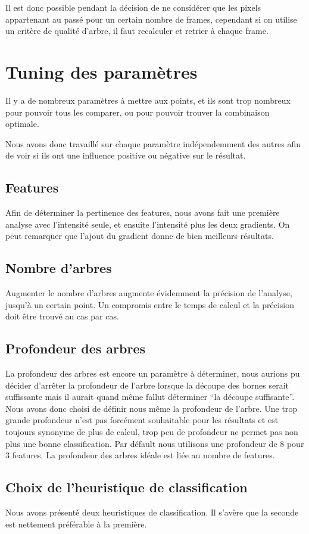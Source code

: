 \documentclass[11pt,a4paper]{report}
\begin{document}
			Il est donc possible pendant la décision de ne considérer que les pixels appartenant au passé pour un certain nombre de 
			frames, cependant si on utilise un critère de qualité d'arbre, il faut recalculer et retrier à chaque frame.

\section{Tuning des paramètres}

	Il y a de nombreux paramètres à mettre aux points, et ils sont trop nombreux pour pouvoir tous les comparer, ou pour pouvoir trouver la combinaison optimale.
	
	Nous avons donc travaillé sur chaque paramètre indépendemment des autres afin de voir si ils ont une influence positive ou négative sur le résultat. 
	\subsection{Features}
		Afin de déterminer la pertinence des features, nous avons fait une première analyse avec l'intensité seule, et ensuite l'intensité 
		plus les deux gradients.
		On peut remarquer que l'ajout du gradient donne de bien meilleurs résultats.
	\subsection{Nombre d'arbres}
	Augmenter le nombre d'arbres augmente évidemment la précision de l'analyse, jusqu'à un certain point. Un compromis entre le temps de calcul et la
	précision doit être trouvé au cas par cas. 

	\subsection{Profondeur des arbres}
	La profondeur des arbres est encore un paramètre à déterminer, nous aurions pu décider d'arrêter la profondeur de l'arbre lorsque la découpe 
	des bornes serait suffissante mais il aurait quand même fallut déterminer ``la découpe suffisante''. Nous avons donc choisi de 
	définir nous même la profondeur de l'arbre. Une trop grande profondeur n'est pas forcément souhaitable pour les résultats et 
	est toujours synonyme de plus de calcul, trop peu de profondeur ne permet pas non plus une bonne classification. 
	Par défault nous utilisons une profondeur de 8 pour 3 features. La profondeur des arbres idéale est liée au nombre de features.

	\subsection{Choix de l'heuristique de classification}
	Nous avons présenté deux heuristiques de classification. Il s'avère que la seconde est nettement préférable à la première. 
\end{document}
